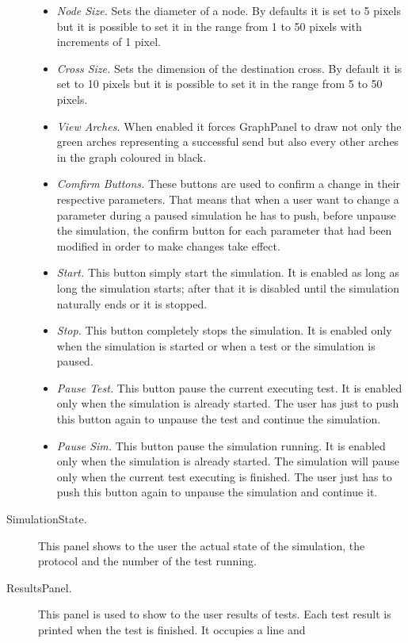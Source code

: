 \begin{description}
\begin{itemize}
    \item \textit{Node Size.} Sets the diameter of a node. By defaults it is set to 5
    pixels but it is possible to set it in the range from 1 to 50 pixels with
    increments of 1 pixel.
    \item \textit{Cross Size.} Sets the dimension of the destination cross. By default
    it is set to 10 pixels but it is possible to set it in the range from 5 to
    50 pixels.
    \item \textit{View Arches.} When enabled it forces GraphPanel to draw not 
    only the green arches representing a successful send but also every other 
    arches in the graph coloured in black. 
    \item \textit{Comfirm Buttons.} These buttons are used to confirm a change in their
    respective parameters. That means that when a user want to change a parameter
    during a paused simulation he has to push, before unpause the simulation, the
    confirm button for each parameter that had been modified in order to make 
    changes take effect. 
    \item \textit{Start.} This button simply start the simulation. It is enabled
    as long as long the simulation starts; after that it is disabled until the
    simulation naturally ends or it is stopped.
    \item \textit{Stop.} This button completely stops the simulation. It is enabled only when
    the simulation is started or when a test or the simulation is paused.
    \item \textit{Pause Test.} This button pause the current executing test. It is enabled
    only when the simulation is already started. The user has just to push this button
    again to unpause the test and continue the simulation.
    \item \textit{Pause Sim.} This button pause the simulation running. It is enabled only
    when the simulation is already started. The simulation will pause only when the
    current test executing is finished. The user just has to push this button again
    to unpause the simulation and continue it.
  \end{itemize}
  \item[SimulationState.] This panel shows to the user the actual state of the
  simulation, the protocol and the number of the test running.
  \item[ResultsPanel.] This panel is used to show to the user results of tests.
  Each test result is printed when the test is finished. It occupies a line and

\end{description}
